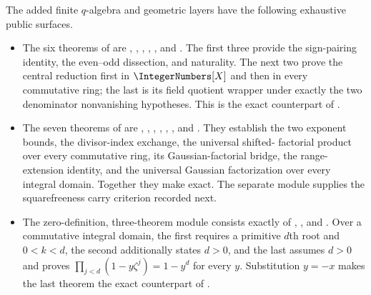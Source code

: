 \documentclass[11pt,a4paper,oneside,openany]{book}
\theoremstyle{definition}
\theoremstyle{remark}
\begin{document}
The added finite \(q\)-algebra and geometric layers have the following
exhaustive public surfaces.
\begin{itemize}
\item The six theorems of  are
,
,
,
,
, and
.  The first three provide the
sign-pairing identity, the even--odd dissection, and naturality.  The next
two prove the central reduction first in \(\IntegerNumbers[X]\) and then in
every commutative ring; the last is its field quotient wrapper under exactly
the two denominator nonvanishing hypotheses.  This is the exact counterpart
of .

\item The seven theorems of  are
,
,
,
,
,
, and
.  They establish the
two exponent bounds, the divisor-index exchange, the universal shifted-
factorial product over every commutative ring, its Gaussian-factorial bridge,
the range-extension identity, and the universal Gaussian factorization over
every integral domain.  Together they make
 exact.  The separate
 module supplies the squarefreeness carry
criterion recorded next.

\item The zero-definition, three-theorem module
 consists exactly of
,
, and
.  Over a commutative
integral domain, the first requires a primitive $d$th root and $0<k<d$, the
second additionally states $d>0$, and the last assumes $d>0$ and proves
$\prod_{j<d}(1-y\zeta^j)=1-y^d$ for every $y$.  Substitution $y=-x$ makes
the last theorem the exact counterpart of .


\end{itemize}
\end{document}
